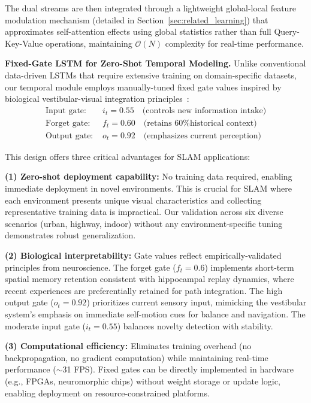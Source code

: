 The dual streams are then integrated through a lightweight global-local feature modulation mechanism (detailed in Section~\ref{sec:related_learning}) that approximates self-attention effects using global statistics rather than full Query-Key-Value operations, maintaining $\mathcal{O}(N)$ complexity for real-time per\-for\-mance.

\textbf{Fixed-Gate LSTM for Zero-Shot Temporal Modeling.}
Unlike conventional data-driven LSTMs that require extensive training on do\-main-spe\-cif\-ic datasets, our temporal module employs manually-tuned fixed gate values inspired by biological ves\-tib\-u\-lar-visual integration principles~\cite{Angelaki2004, Cullen2012}:
\begin{align}
    \text{Input gate: }  & i_t = 0.55 \quad \text{(controls new information intake)} \\
    \text{Forget gate: } & f_t = 0.60 \quad \text{(retains 60\% historical context)} \\
    \text{Output gate: } & o_t = 0.92 \quad \text{(emphasizes current perception)}
\end{align}

This design offers three critical advantages for SLAM applications:

\textbf{(1) Zero-shot deployment capability:} No training data required, enabling immediate deployment in novel environments. This is crucial for SLAM where each environment presents unique visual characteristics and collecting representative training data is impractical. Our validation across six diverse scenarios (urban, highway, indoor) without any environment-specific tuning demonstrates robust generalization.

\textbf{(2) Biological interpretability:} Gate values reflect em\-pir\-i\-cal\-ly-val\-i\-dat\-ed principles from neuroscience. The forget gate ($f_t=0.6$) implements short-term spatial memory retention consistent with hippocampal replay dynamics, where recent experiences are preferentially retained for path integration. The high output gate ($o_t=0.92$) prioritizes current sensory input, mimicking the ves\-tib\-u\-lar system's emphasis on immediate self-motion cues for balance and navigation. The moderate input gate ($i_t=0.55$) balances novelty detection with stability.

\textbf{(3) Computational efficiency:} Eliminates training overhead (no backpropagation, no gradient computation) while maintaining real-time per\-for\-mance ($\sim$31 FPS). Fixed gates can be directly implemented in hardware (e.g., FPGAs, neuromorphic chips) without weight storage or update logic, enabling deployment on resource-constrained platforms.

